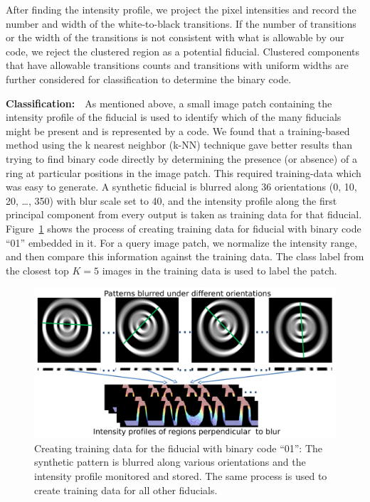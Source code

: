 After finding the intensity profile, we project the pixel intensities
and record the number and width of the white-to-black transitions.  If
the number of transitions or the width of the transitions is not
consistent with what is allowable by our code, we reject the clustered
region as a potential fiducial.  Clustered components that have
allowable transitions counts and transitions with uniform widths are
further considered for classification to determine the binary code.

\textbf{Classification:}~~As mentioned above, a small image patch
containing the intensity profile of the fiducial is used to identify
which of the many fiducials might be present and is represented by a
code.  We found that a training-based method using the k nearest
neighbor (k-NN) technique gave better results than trying to find
binary code directly by determining the presence (or absence) of a ring
at particular positions in the image patch. This required
training-data which was easy to generate. A synthetic fiducial
is blurred along 36 orientations (0, 10, 20, \ldots , 350) with blur
scale set to 40, and the intensity profile along the first principal
component from every output is taken as training data for that
fiducial. Figure~\ref{fig:training_data} shows the process of
creating training data for fiducial with binary code ``01'' embedded
in it.  For a query image patch, we normalize the intensity range, and
then compare this information against the training data. The class
label from the closest top $K=5$ images in the training data is used
to label the patch.

\begin{figure}[h!]
\centering
  \includegraphics[width=0.95\linewidth]{figures/fiducial/training_data.pdf}
  \caption[Creation of training data for classification  for the fiducial with
  binary code ``01'']{Creating training data for the fiducial with binary code
  ``01'': The synthetic pattern is blurred along various orientations and the
  intensity profile monitored and stored. The same process is used to create
  training data for all other fiducials.}
  \label{fig:training_data}
\end{figure}

